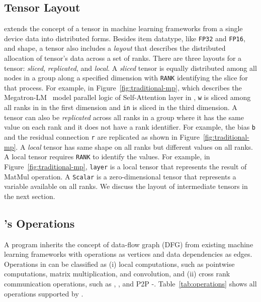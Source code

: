 \subsection{Tensor Layout}
\tool extends the concept of a tensor in machine learning frameworks from a single device data into distributed forms.
Besides item datatype, like \texttt{FP32} and \texttt{FP16}, and shape,
a \tool tensor also includes a \emph{layout} that describes the distributed allocation of tensor's data across a set of ranks. 
There are three layouts for a tensor: \emph{sliced}, \emph{replicated}, and \emph{local}.
A \emph{sliced} tensor is equally distributed among all nodes in a group along a specified dimension with \texttt{RANK} identifying the slice for that process.
For example, in Figure~\ref{fig:traditional-mp}, which describes the Megatron-LM~\cite{megatronlm} model parallel logic of Self-Attention layer in \tool, \texttt{w} is sliced among all ranks in \WORLD in the 
first dimension and \texttt{in} is sliced in the third dimension.
A tensor can also be \emph{replicated} across all ranks in a group where it has the same value on each rank and it does not have a rank identifier.
For example, the bias \texttt{b} and the residual connection \texttt{r} are replicated as shown in Figure~\ref{fig:traditional-mp}. 
A \emph{local} tensor has same shape on all ranks but different
values on all ranks. A local tensor requires \texttt{RANK} to 
identify the values. For example, in Figure~\ref{fig:traditional-mp}, \texttt{layer}
is a local tensor that represents the result of MatMul operation.
A \texttt{Scalar} is a zero-dimensional tensor that represents a variable available on all ranks.
We discuss the layout of 
intermediate tensors in the next section.

\subsection{\tool's Operations}
A \tool program inherits the concept of data-flow graph (DFG) from existing machine learning frameworks with operations as vertices and data dependencies as edges.
Operations in \tool can be classified as (i) local computations, such as pointwise computations, matrix multiplication, and convolution, and (ii) cross rank communication operations, such as \allreduce, \allgather, and P2P \send-\recv.
Table~\ref{tab:operations} shows all operations supported by \tool{}.

